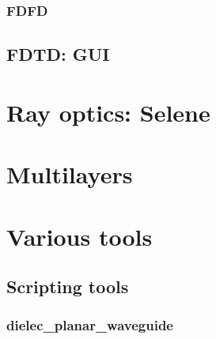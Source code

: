 \documentclass[a4paper,11pt]{book}
\newcommand{\lfc}[1]{\textbf{\color{blue}{#1}}}
\newcommand{\lft}[1]{\textbf{\textcolor{red}{#1}}}
\newcommand{\lsgnq}[1]{\textbf{\textcolor{pink}{#1}}}
\begin{document}
\section{FDFD}





\chapter{FDTD: GUI}


\part{Ray optics: Selene}






\part{Multilayers}








\part{Various tools}

\chapter{Scripting tools}

\section{dielec\_planar\_waveguide}

%	
\end{document}
